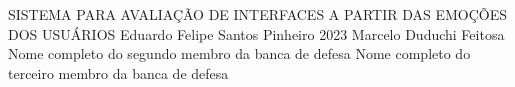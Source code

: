 \documentclass[12pt,openright]{book}
\begin{document}
%
%
%
\capa
{SISTEMA PARA AVALIAÇÃO DE INTERFACES A
PARTIR DAS EMOÇÕES DOS USUÁRIOS}
{Eduardo Felipe Santos Pinheiro}
{2023}
{Marcelo Duduchi Feitosa}
{Nome completo do segundo membro da banca de defesa}
{Nome completo do terceiro membro da banca de defesa}

\end{document}
